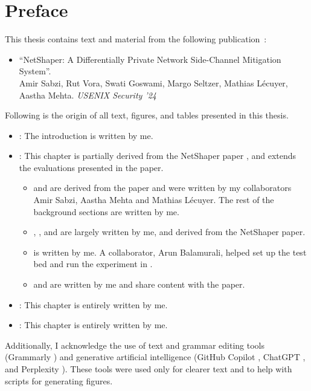 
\chapter{Preface}


This thesis contains text and material from the following publication~\cite{sabzi2024netshaper}:
\begin{itemize}
  \item ``NetShaper: A Differentially Private Network Side-Channel Mitigation System''.
  \\
  Amir Sabzi, Rut Vora, Swati Goswami, Margo Seltzer, Mathias Lécuyer, Aastha Mehta. \textit{USENIX Security '24}
\end{itemize}

Following is the origin of all text, figures, and tables presented in this thesis.

\begin{itemize}
  \item \textbf{}: The introduction is written by me. 
  
  \item \textbf{}: This chapter is partially derived from the NetShaper paper \cite{sabzi2024netshaper}, and extends the evaluations presented in the paper.
  \begin{itemize}
      \item {} and  are derived from the paper and were written by my collaborators Amir Sabzi, Aastha Mehta and Mathias L\'{e}cuyer. The rest of the background sections are written by me.
      \item {}, , and  are largely written by me, and derived from the NetShaper paper.
      \item {} is written by me. A collaborator, Arun Balamurali, helped set up the test bed and run the experiment in .
      \item {} and  are written by me and share content with the paper.
  \end{itemize}
  
  \item \textbf{}: This chapter is entirely written by me.
  
  \item \textbf{}: This chapter is entirely written by me.

\end{itemize}


Additionally, I acknowledge the use of text and grammar editing tools (Grammarly \cite{grammarly}) and generative artificial intelligence (GitHub Copilot \cite{github_copilot}, ChatGPT \cite{chatgpt}, and Perplexity \cite{perplexity}). 
These tools were used only for clearer text and to help with scripts for generating figures.